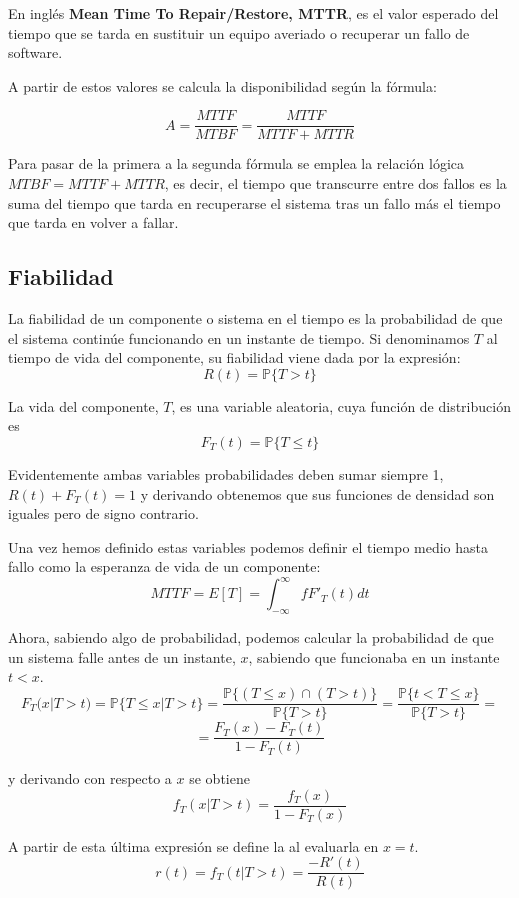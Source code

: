\begin{defn}

En inglés \textbf{Mean Time To Repair/Restore, MTTR}, es el valor esperado del tiempo que se tarda en sustituir un equipo averiado o recuperar un fallo de software.
\end{defn}

A partir de estos valores se calcula la disponibilidad según la fórmula:

\[A=\frac{MTTF}{MTBF}=\frac{MTTF}{MTTF+MTTR}\]

Para pasar de la primera a la segunda fórmula se emplea la relación lógica $MTBF=MTTF+MTTR$, es decir, el tiempo que transcurre entre dos fallos es la suma del tiempo que tarda en recuperarse el sistema tras un fallo más el tiempo que tarda en volver a fallar.

\subsection{Fiabilidad}

La fiabilidad de un componente o sistema en el tiempo es la probabilidad de que el sistema continúe funcionando en un instante de tiempo. Si denominamos $T$ al tiempo de vida del componente, su fiabilidad viene dada por la expresión:
\[R(t)=\mathbb{P}\{T > t \}\]

La vida del componente, $T$, es una variable aleatoria, cuya función de distribución es
\[F_T(t)=\mathbb{P}\{T \leq t \}\]

Evidentemente ambas variables probabilidades deben sumar siempre 1, $R(t)+F_T(t)=1$ y derivando obtenemos que sus funciones de densidad son iguales pero de signo contrario.

Una vez hemos definido estas variables podemos definir el tiempo medio hasta fallo como la esperanza de vida de un componente:
\[MTTF = E[T]=\int_{-\infty}^{\infty}fF'_T(t)dt\]

Ahora, sabiendo algo de probabilidad, podemos calcular la probabilidad de que un sistema falle antes de un instante, $x$, sabiendo que funcionaba en un instante $t<x$.
\[F_T(x | T > t ) = \mathbb{P}\{T \leq x | T> t\}=\frac{\mathbb{P}\{(T \leq x) \cap (T > t)\}}{\mathbb{P}\{T > t\}}=\frac{\mathbb{P}\{t < T \leq x\}}{\mathbb{P}\{T > t\}}=\]
\[=\frac{F_T(x)-F_T(t)}{1-F_T(t)}\]

y derivando con respecto a $x$ se obtiene
\[f_T(x | T > t)=\frac{f_T(x)}{1-F_T(x)}\]

A partir de esta última expresión se define la  al evaluarla en $x=t$.
\[r(t)=f_T(t | T > t)=\frac{-R'(t)}{R(t)}\]

